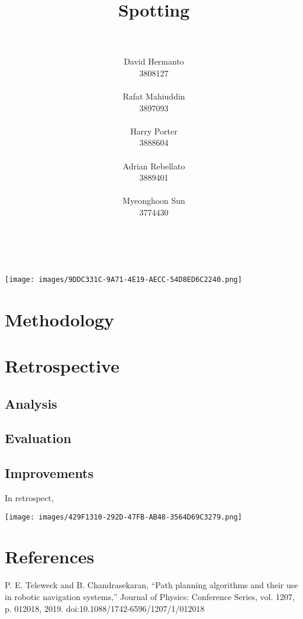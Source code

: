 \documentclass[10pt,english]{article}
\title{\huge{\textbf{Spotting}}}
\author{
    \\\\
    David Hermanto\\
    \small 3808127\\
    \\
    Rafat Mahiuddin\\
    \small 3897093\\
    \\
    Harry Porter\\
    \small 3888604\\
    \\
    Adrian Rebellato\\
    \small 3889401\\
    \\
    Myeonghoon Sun\\
    \small 3774430\\
    \\\\
}
\date{}
\begin{document}
\maketitle
\thispagestyle{empty}
\clearpage

\vspace*{\fill}
\begin{center}
\texttt{[image: images/9DDC331C-9A71-4E19-AECC-54D8ED6C2240.png]}
\end{center}
\vfill
\thispagestyle{empty}

\clearpage


\section*{Methodology}
\clearpage

\section*{Retrospective}
\clearpage

\subsection*{Analysis}
\clearpage

\subsection*{Evaluation}
\clearpage

\subsection*{Improvements}

In retrospect,

\clearpage

\vspace*{\fill}
\begin{center}
\texttt{[image: images/429F1310-292D-47FB-AB48-3564D69C3279.png]}
\end{center}
\vfill
\thispagestyle{empty}
\clearpage

\section*{References}

\begin{enumerate}[leftmargin=*,label={\texttt{[\arabic*]}},noitemsep]
    \item P. E. Teleweck and B. Chandrasekaran, “Path planning algorithms and their use in robotic navigation systems,” Journal of Physics: Conference Series, vol. 1207, p. 012018, 2019. doi:10.1088/1742-6596/1207/1/012018
\end{enumerate}
\end{document}
